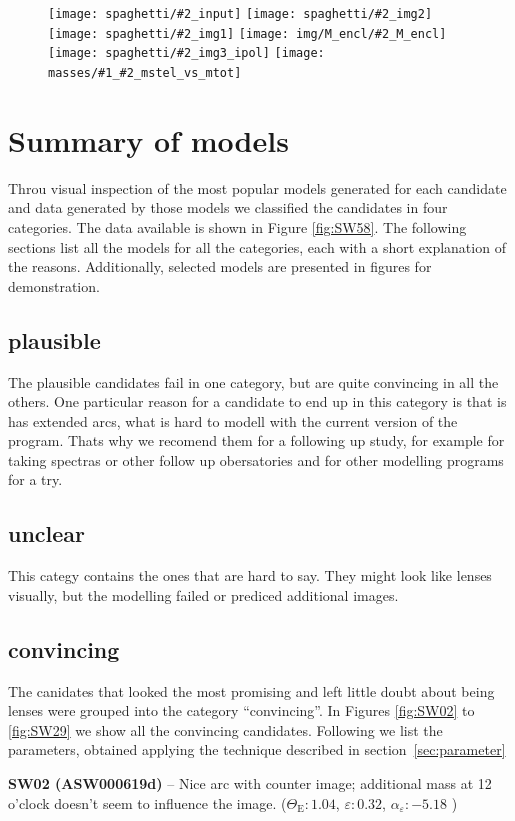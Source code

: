 \documentclass[fleqn,usenatbib]{mnras}
\newcommand{\inclfig}[2]{
  \centering
	\texttt{[image: spaghetti/\#2\_input]}%
	\texttt{[image: spaghetti/\#2\_img2]}
	\texttt{[image: spaghetti/\#2\_img1]}%
	\texttt{[image: img/M\_encl/\#2\_M\_encl]}
	\texttt{[image: spaghetti/\#2\_img3\_ipol]}%
	\texttt{[image: masses/\#1\_\#2\_mstel\_vs\_mtot]}
}
\newcommand{\lenstitle}[1]{\noindent\textbf{#1} --}
\newcommand{\params}[3]{(\(\Theta_\text{E}:#1\), $\varepsilon:#2$, $\alpha_\varepsilon:#3$ )}
\newcommand{\figref}[1]{Figure \ref{fig:#1}}
\begin{document}
\begin{figure}
  \inclfig{SW57}{ASW0008pag_5SXGXQYY6V}
  \caption{}
  \label{fig:SW57}
\end{figure}


\section{Summary of models}

Throu visual inspection of the most popular models generated for each candidate and data generated by those models we classified the candidates in four categories.
The data available is shown in \figref{SW58}.
The following sections list all the models for all the categories, each with a short explanation of the reasons.
Additionally, selected models are presented in figures for demonstration.

\subsection{plausible}

The plausible candidates fail in one category, but are quite convincing in all the others.
One particular reason for a candidate to end up in this category is that is has extended arcs, what is hard to modell with the current version of the program.
Thats why we recomend them for a following up study, for example for taking spectras or other follow up obersatories and for other modelling programs for a try.


\subsection{unclear}

This categy contains the ones that are hard to say.
They might look like lenses visually, but the modelling failed or prediced additional images.


\subsection{convincing}

The canidates that looked the most promising and left little doubt about being lenses were grouped into the category ``convincing''.
In Figures \ref{fig:SW02} to \ref{fig:SW29} we show all the convincing candidates.
Following we list the parameters, obtained applying the technique described in section~\ref{sec:parameter}

\lenstitle{SW02 (ASW000619d)}
Nice arc with counter image;
additional mass at 12 o'clock doesn't seem to influence the image.
\params{1.04}{0.32}{-5.18}
\end{document}
